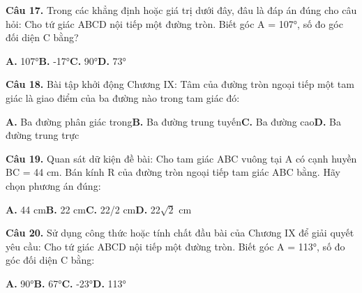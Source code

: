 \documentclass[11pt,a4paper]{article}
\begin{document}
\textbf{\color{primary} Câu 17.} Trong các khẳng định hoặc giá trị dưới đây, đâu là đáp án đúng cho câu hỏi: Cho tứ giác ABCD nội tiếp một đường tròn. Biết góc A = 107°, số đo góc đối diện C bằng?\par
\hspace*{1.5em}\textbf{A.} 107°\quad\quad \textbf{B.} -17°\quad\quad \textbf{C.} 90°\quad\quad \textbf{D.} 73°\par\vspace{2pt}
\textbf{\color{primary} Câu 18.} Bài tập khởi động Chương IX: Tâm của đường tròn ngoại tiếp một tam giác là giao điểm của ba đường nào trong tam giác đó:\par
\hspace*{1.5em}\textbf{A.} Ba đường phân giác trong\quad\quad \textbf{B.} Ba đường trung tuyến\quad\quad \textbf{C.} Ba đường cao\quad\quad \textbf{D.} Ba đường trung trực\par\vspace{2pt}
\textbf{\color{primary} Câu 19.} Quan sát dữ kiện đề bài: Cho tam giác ABC vuông tại A có cạnh huyền BC = 44 cm. Bán kính R của đường tròn ngoại tiếp tam giác ABC bằng. Hãy chọn phương án đúng:\par
\hspace*{1.5em}\textbf{A.} 44 cm\quad\quad \textbf{B.} 22 cm\quad\quad \textbf{C.} 22/2 cm\quad\quad \textbf{D.} 22$\sqrt{2}$ cm\par\vspace{2pt}
\textbf{\color{primary} Câu 20.} Sử dụng công thức hoặc tính chất đầu bài của Chương IX để giải quyết yêu cầu: Cho tứ giác ABCD nội tiếp một đường tròn. Biết góc A = 113°, số đo góc đối diện C bằng:\par
\hspace*{1.5em}\textbf{A.} 90°\quad\quad \textbf{B.} 67°\quad\quad \textbf{C.} -23°\quad\quad \textbf{D.} 113°\par\vspace{2pt}
\end{document}
